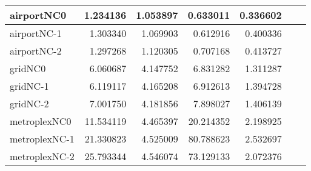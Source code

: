 \begin{longtable}{|l|r|r|r|r|r|r|}
airportNC0 & 1.234136 & 1.053897 & 0.633011 & 0.336602 \\ \hline
airportNC-1 & 1.303340 & 1.069903 & 0.612916 & 0.400336 \\ \hline
airportNC-2 & 1.297268 & 1.120305 & 0.707168 & 0.413727 \\ \hline
gridNC0 & 6.060687 & 4.147752 & 6.831282 & 1.311287 \\ \hline
gridNC-1 & 6.119117 & 4.165208 & 6.912613 & 1.394728 \\ \hline
gridNC-2 & 7.001750 & 4.181856 & 7.898027 & 1.406139 \\ \hline
metroplexNC0 & 11.534119 & 4.465397 & 20.214352 & 2.198925 \\ \hline
metroplexNC-1 & 21.330823 & 4.525009 & 80.788623 & 2.532697 \\ \hline
metroplexNC-2 & 25.793344 & 4.546074 & 73.129133 & 2.072376 \\ \hline
\end{longtable}
